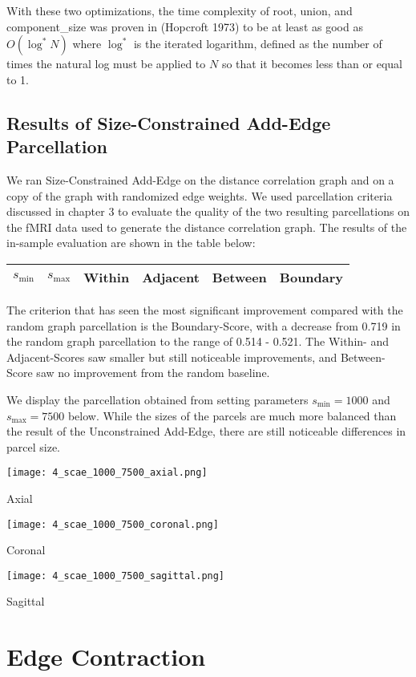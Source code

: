 With these two optimizations, the time complexity of root, union, and
component\_size was proven in (Hopcroft 1973) to be at least as good as
$O(\log^* N)$ where $\log^*$ is the iterated logarithm, defined as the
number of times the natural log must be applied to $N$ so that it
becomes less than or equal to 1.

\subsection{Results of Size-Constrained Add-Edge Parcellation}

We ran Size-Constrained Add-Edge on the distance correlation graph and
on a copy of the graph with randomized edge weights. We used
parcellation criteria discussed in chapter 3 to evaluate the quality of
the two resulting parcellations on the fMRI data used to generate the
distance correlation graph. The results of the in-sample evaluation are
shown in the table below:

\begin{tabular}{c c | c c c c}
    $s_{\min}$ & $s_{\max}$ & Within & Adjacent & Between & Boundary \\
    \hline
    
\end{tabular}

The criterion that has seen the most significant improvement compared
with the random graph parcellation is the Boundary-Score, with a
decrease from 0.719 in the random graph parcellation to the range of
0.514 - 0.521. The Within- and Adjacent-Scores saw smaller but still
noticeable improvements, and Between-Score saw no improvement from the
random baseline.

We display the parcellation obtained from setting parameters
$s_{\min} = 1000$ and $s_{\max} = 7500$ below. While the sizes of the
parcels are much more balanced than the result of the Unconstrained
Add-Edge, there are still noticeable differences in parcel size.

\begin{center}
\texttt{[image: 4\_scae\_1000\_7500\_axial.png]}

Axial

\texttt{[image: 4\_scae\_1000\_7500\_coronal.png]}

Coronal

\texttt{[image: 4\_scae\_1000\_7500\_sagittal.png]}

Sagittal
\end{center}
\section{Edge Contraction}

